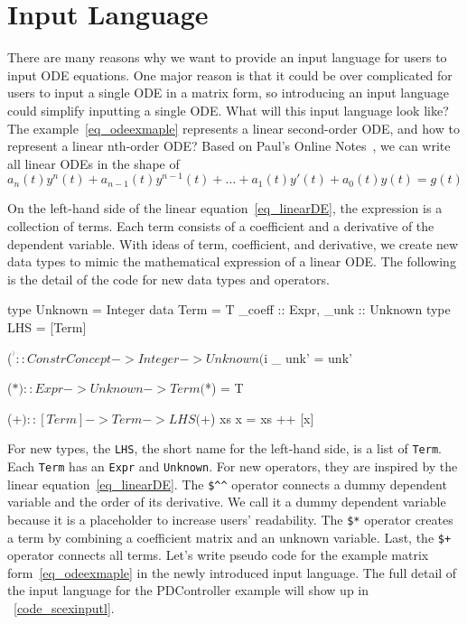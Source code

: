 \section{Input Language}
\label{sec_input}
There are many reasons why we want to provide an input language for users to input ODE equations. One major reason is that it could be over complicated for users to input a single ODE in a matrix form, so introducing an input language could simplify inputting a single ODE. What will this input language look like? The example~\ref{eq_odeexmaple} represents a linear second-order ODE, and how to represent a linear nth-order ODE? Based on Paul's Online Notes~\citep{paullinearode}, we can write all linear ODEs in the shape of 
\begin{equation} \label{eq_linearDE}
	a_n(t)y^n(t) + a_{n-1}(t)y^{n-1}(t) + \dots + a_1(t)y'(t) + a_0(t)y(t) = g(t)
\end{equation}

On the left-hand side of the linear equation~\ref{eq_linearDE}, the expression is a collection of terms. Each term consists of a coefficient and a derivative of the dependent variable. With ideas of term, coefficient, and derivative, we create new data types to mimic the mathematical expression of a linear ODE. The following is the detail of the code for new data types and operators.

\begin{haskell1}
type Unknown = Integer
data Term = T{
	_coeff :: Expr,
	_unk :: Unknown
}
type LHS = [Term]

($^^) :: ConstrConcept -> Integer -> Unknown
($^^) _ unk' = unk'

($*) :: Expr -> Unknown -> Term
($*) = T

($+) :: [Term] -> Term -> LHS
($+) xs x  = xs ++ [x]
\end{haskell1}

For new types, the \verb|LHS|, the short name for the left-hand side, is a list of \verb|Term|. Each \verb|Term| has an \verb|Expr| and \verb|Unknown|. For new operators, they are inspired by the linear equation~\ref{eq_linearDE}. The \verb|$^^| operator connects a dummy dependent variable and the order of its derivative. We call it a dummy dependent variable because it is a placeholder to increase users' readability. The \verb|$*| operator creates a term by combining a coefficient matrix and an unknown variable. Last, the \verb|$+| operator connects all terms. Let's write pseudo code for the example matrix form~\ref{eq_odeexmaple} in the newly introduced input language. The full detail of the input language for the PDController example will show up in ~\ref{code_scexinputl}.

